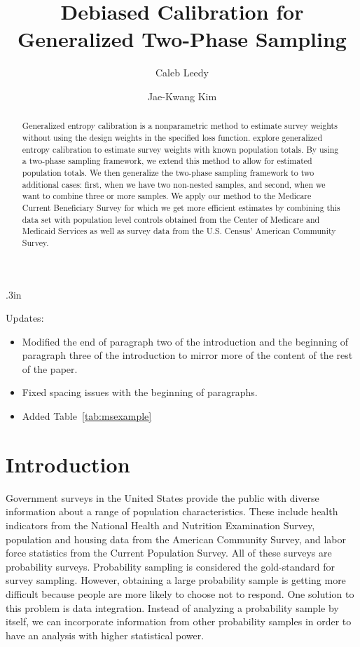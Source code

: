 \documentclass[12pt]{article}
\begin{document}
\title{Debiased Calibration for Generalized Two-Phase Sampling}
\author{Caleb Leedy \and Jae-Kwang Kim}
\maketitle 

\baselineskip .3in

\begin{abstract}
Generalized entropy calibration \citep{gneiting2007strictly} is a nonparametric
method to estimate survey weights without using the design weights in the
specified loss function. \cite{kwon2024debiased} explore generalized
entropy calibration to estimate survey weights with known population totals.
By using a two-phase sampling framework, we extend this method to allow for
estimated population totals. We then generalize the two-phase sampling framework to
two additional cases: first, when we have two non-nested samples, and
second, when we want to combine three or more samples. 
We apply our method to the Medicare Current Beneficiary Survey for which we
get more efficient estimates by combining this data set with population level
controls obtained from the Center of Medicare and Medicaid Services as well as
survey data from the U.S. Census' American Community Survey.
\end{abstract}

Updates:
\begin{itemize}
  \item Modified the end of paragraph two of the introduction and the beginning
    of paragraph three of the introduction to mirror more of the content of the
    rest of the paper.
  \item Fixed spacing issues with the beginning of paragraphs.
  \item Added Table~\ref{tab:msexample}
\end{itemize}
\newpage

\section{Introduction}

Government surveys in the United States provide the public with diverse
information about a range of population characteristics. These include health
indicators from the National Health and Nutrition Examination Survey, population
and housing data from the American Community Survey, and labor force statistics
from the Current Population Survey. All of these surveys are probability
surveys. Probability sampling is considered the
gold-standard for survey sampling. However, obtaining a large probability
sample is getting more difficult because people are more likely to choose not to
respond. One solution to this problem is data integration. Instead of analyzing
a probability sample by itself, we can incorporate information from other
probability samples in order to have an analysis with higher statistical power.
\end{document}
